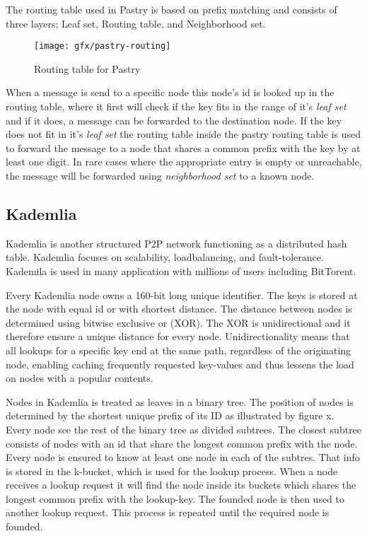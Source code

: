 The routing table used in Pastry is based on prefix matching and consists of three layers; Leaf set, Routing table, and Neighborhood set.
\begin{figure}[bth]
\texttt{[image: gfx/pastry-routing]}
\caption[routingtable]{Routing table for Pastry} \label{fig:pastryrouting}
\end{figure}
When a message is send to a specific node this node's id is looked up in the routing table, where it first will check if the key fits in the range of it's \emph{leaf set} and if it does, a message can be forwarded to the destination node.
If the key does not fit in it's \emph{leaf set} the routing table inside the pastry routing table is used to forward the message to a node that shares a common prefix with the key by at least one digit.
In rare cases where the appropriate entry is empty or unreachable, the message will be forwarded using \emph{neighborhood set} to a known node.


\subsection{Kademlia}
Kademlia is another structured P2P network functioning as a distributed hash table. Kademlia focuses on scalability, loadbalancing, and fault-tolerance. Kademila is used in many application with millions of users including BitTorent.

Every Kademlia node owns a 160-bit long unique identifier. The keys is stored at the node with equal id or with shortest distance.
The distance between nodes is determined using bitwise exclusive or (XOR). The XOR is unidirectional and it therefore ensure a unique distance for every node. Unidirectionality means that all lookups for a specific key end at the same path, regardless of the originating node, enabling caching frequently requested key-values and thus lessens the load on nodes with a popular contents.

Nodes in Kademlia is treated as leaves in a binary tree. The position of nodes is determined by the shortest unique prefix of its ID as illustrated by figure x. Every node see the rest of the binary tree as divided subtrees. The closest subtree consists of nodes with an id that share the longest common prefix with the node. Every node is ensured to know at least one node in each of the subtres. That info is stored in the k-bucket, which is used for the lookup process. When a node receives a lookup request it will find the node inside its buckets which shares the longest common prefix with the lookup-key. The founded node is then used to another lookup request. This process is repeated until the required node is founded.


